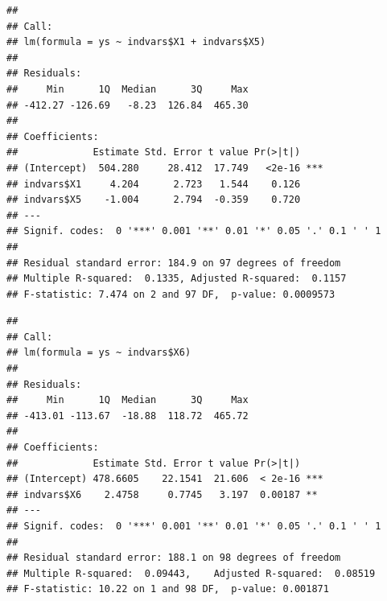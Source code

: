 \documentclass[
]{book}
\newenvironment{Shaded}{\begin{snugshade}}{\end{snugshade}}
\newcommand{\FunctionTok}[1]{\textcolor[rgb]{0.00,0.00,0.00}{#1}}
\newcommand{\NormalTok}[1]{#1}
\newcommand{\OtherTok}[1]{\textcolor[rgb]{0.56,0.35,0.01}{#1}}
\newcommand{\SpecialCharTok}[1]{\textcolor[rgb]{0.00,0.00,0.00}{#1}}
\begin{document}
\begin{verbatim}
## 
## Call:
## lm(formula = ys ~ indvars$X1 + indvars$X5)
## 
## Residuals:
##     Min      1Q  Median      3Q     Max 
## -412.27 -126.69   -8.23  126.84  465.30 
## 
## Coefficients:
##             Estimate Std. Error t value Pr(>|t|)    
## (Intercept)  504.280     28.412  17.749   <2e-16 ***
## indvars$X1     4.204      2.723   1.544    0.126    
## indvars$X5    -1.004      2.794  -0.359    0.720    
## ---
## Signif. codes:  0 '***' 0.001 '**' 0.01 '*' 0.05 '.' 0.1 ' ' 1
## 
## Residual standard error: 184.9 on 97 degrees of freedom
## Multiple R-squared:  0.1335, Adjusted R-squared:  0.1157 
## F-statistic: 7.474 on 2 and 97 DF,  p-value: 0.0009573
\end{verbatim}

\begin{Shaded}
\end{Shaded}

\begin{verbatim}
## 
## Call:
## lm(formula = ys ~ indvars$X6)
## 
## Residuals:
##     Min      1Q  Median      3Q     Max 
## -413.01 -113.67  -18.88  118.72  465.72 
## 
## Coefficients:
##             Estimate Std. Error t value Pr(>|t|)    
## (Intercept) 478.6605    22.1541  21.606  < 2e-16 ***
## indvars$X6    2.4758     0.7745   3.197  0.00187 ** 
## ---
## Signif. codes:  0 '***' 0.001 '**' 0.01 '*' 0.05 '.' 0.1 ' ' 1
## 
## Residual standard error: 188.1 on 98 degrees of freedom
## Multiple R-squared:  0.09443,    Adjusted R-squared:  0.08519 
## F-statistic: 10.22 on 1 and 98 DF,  p-value: 0.001871
\end{verbatim}

\begin{Shaded}
\end{Shaded}
\end{document}
